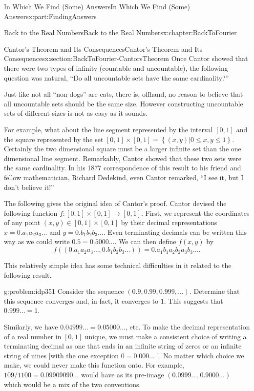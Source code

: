 \documentclass[oneside,10pt,]{book}
\numberwithin{equation}{section}
\begin{document}
\begin{partptx}{In Which We Find (Some) Answers}{}{In Which We Find (Some) Answers}{}{}{x:part:FindingAnswers}
\begin{chapterptx}{Back to the Real Numbers}{}{Back to the Real Numbers}{}{}{x:chapter:BackToFourier}
\begin{sectionptx}{Cantor's Theorem and Its Consequences}{}{Cantor's Theorem and Its Consequences}{}{}{x:section:BackToFourier-CantorsTheorem}
Once Cantor showed that there were two types of infinity (countable and uncountable), the following question was natural, ``Do all uncountable sets have the same cardinality?''%
\par
Just like not all ``non-dogs'' are cats, there is, offhand, no reason to believe that all uncountable sets should be the same size. However constructing uncountable sets of different sizes is not as easy as it sounds.%
\par
{} For example, what about the line segment represented by the interval \([0,1]\) and the square represented by the set \([0,1]\times[0,1]=\left\{(x,y)|0\leq x,y\leq 1\right\}\). Certainly the two dimensional square must be a larger infinite set than the one dimensional line segment.  Remarkably, Cantor showed that these two sets were the same cardinality.  In his 1877 correspondence of this result to his friend and fellow mathematician, Richard Dedekind, even Cantor remarked, ``I see it, but I don't believe it!''%
\par
The following gives the original idea of Cantor's proof. Cantor devised the following function \(f:[0,1]\times[0,1]\rightarrow [0,1]\). First, we represent the coordinates of any point \((x,y)\in [0,1]\times[0,1]\) by their decimal representations \(x=0.a_1 a_2 a_3\ldots\) and \(y=0.b_1 b_2 b_3\ldots\). Even terminating decimals can be written this way as we could write \(0.5=0.5000\ldots\). We can then define \(f(x,y)\) by%
\begin{equation*}
f((0.a_1 a_2 a_3\ldots ,0.b_1 b_2 b_3\ldots))=0.a_1 b_1 a_2 b_2 a_3 b_3\ldots\text{.}
\end{equation*}
%
\par
This relatively simple idea has some technical difficulties in it related to the following result.%
\begin{problem}{}{g:problem:idp351}%
 Consider the sequence \((0.9,0.99,0.999,\ldots)\). Determine that this sequence converges and, in fact, it converges to \(1\). This suggests that \(0.999\ldots=1\).%
\end{problem}
Similarly, we have \(0.04999\ldots=0.05000\ldots\), etc. To make the decimal representation of a real number in \([0,1]\) unique, we must make a consistent choice of writing a terminating decimal as one that ends in an infinite string of zeros or an infinite string of nines [with the one exception \(0=0.000\ldots\) ]. No matter which choice we make, we could never make this function onto. For example, \(109/1100=0.09909090\ldots\) would have as its pre-image \((0.0999\ldots,0.9000\ldots)\) which would be a mix of the two conventions.%

\end{sectionptx}
\end{chapterptx}
\end{partptx}
\end{document}

